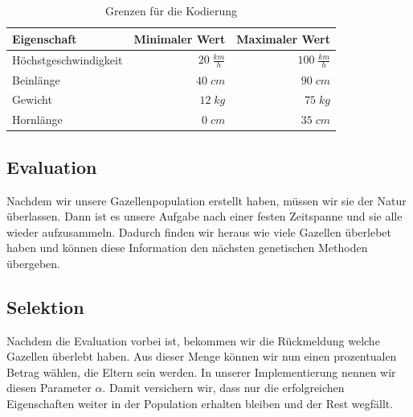             \begin{table}[H]
                \begin{center}
                \begin{tabular}{ |l|r|r| } 
                    \hline
                    Eigenschaft              & Minimaler Wert        & Maximaler Wert       \\ \hline
                    Höchstgeschwindigkeit    & $ 20\; \frac{km}{h}$  & $ 100\; \frac{km}{h}$ \\ \hline
                    Beinlänge                & $ 40\; cm          $  & $ 90\; cm          $ \\ \hline
                    Gewicht                  & $ 12\; kg          $  & $ 75\; kg          $ \\ \hline
                    Hornlänge                & $  0\; cm          $  & $ 35\; cm          $ \\ \hline
                \end{tabular}
                \end{center}
                \caption{Grenzen für die Kodierung \cite{wiki:gazelle} \cite{blog:gazelle}\label{tab:gazelle-bounds}}
            \end{table}
            \noindent

        \subsection{Evaluation}
            Nachdem wir unsere Gazellenpopulation erstellt haben, müssen wir sie der Natur überlassen. Dann ist es unsere Aufgabe nach einer festen Zeitspanne und sie alle wieder aufzusammeln. Dadurch finden wir heraus wie viele Gazellen überlebet haben und können diese Information den nächsten genetischen Methoden übergeben.

        \subsection{Selektion}

            Nachdem die Evaluation vorbei ist, bekommen wir die Rückmeldung welche Gazellen überlebt haben. Aus dieser Menge können wir nun einen prozentualen Betrag wählen, die Eltern sein werden. In unserer Implementierung nennen wir diesen Parameter $\alpha$. Damit versichern wir, dass nur die erfolgreichen Eigenschaften weiter in der Population erhalten bleiben und der Rest wegfällt.

